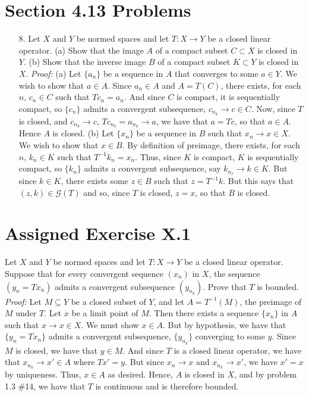 \documentclass{article}
\begin{document}
\section*{Section 4.13 Problems}
\begin{itemize}
    \item[8.] Let $X$ and $Y$ be normed spaces and let $T: X \to Y$ be a closed linear operator. (a) Show that the image $A$ of a compact subset $C \subset X$ is closed in $Y$. (b) Show that the inverse image $B$ of a compact subset $K \subset Y$ is closed in $X$. 
    \newline\newline
    \textit{Proof:} (a) Let $\{a_n\}$ be a sequence in $A$ that converges to some $a \in Y$. We wish to show that $a \in A$. Since $a_n \in A$ and $A = T(C)$, there exists, for each $n$, $c_n \in C$ such that $Tc_n = a_n$. And since $C$ is compact, it is sequentially compact, so $\{c_n\}$ admits a convergent subsequence, $c_{n_k} \to c \in C$. Now, since $T$ is closed, and $c_{n_k} \to c$, $Tc_{n_k} = a_{n_k} \to a$, we have that $a = Tc$, so that $a \in A$. Hence $A$ is closed.
    \newline\newline
    (b) Let $\{x_n\}$ be a sequence in $B$ such that $x_n \to x \in X$. We wish to show that $x \in B$. By definition of preimage, there exists, for each $n$, $k_n \in K$ such that $T^{-1}k_n = x_n$. Thus, since $K$ is compact, $K$ is sequentially compact, so $\{k_n\}$ admits a convergent subsequence, say $k_{n_{\ell}} \to k \in K$. But since $k \in K$, there exists some $z \in B$ such that $z = T^{-1}k$. But this says that $(z,k) \in \mathcal{G}(T)$ and so, since $T$ is closed, $z = x$, so that $B$ is closed.

\end{itemize}

\section*{Assigned Exercise X.1}
Let $X$ and $Y$ be normed spaces and let $T: X \to Y$ be a closed linear operator. Suppose that for every convergent sequence $(x_n)$ in $X$, the sequence $(y_n = Tx_n)$ admits a convergent subsequence $(y_{n_k})$. Prove that $T$ is bounded.
\newline\newline
\textit{Proof:} Let $M \subseteq Y$ be a closed subset of $Y$, and let $A = T^{-1}(M)$, the preimage of $M$ under $T$. Let $x$ be a limit point of $M$. Then there exists a sequence $\{x_n\}$ in $A$ such that $x \to x \in X$. We must show $x \in A$. But by hypothesis, we have that $\{y_n = Tx_n\}$ admits a convergent subsequence, $\{y_{n_k}\}$ converging to some $y$. Since $M$ is closed, we have that $y \in M$. And since $T$ is a closed linear operator, we have that $x_{n_k} \to x' \in A$ where $Tx' = y$. But since $x_n \to x$ and $x_{n_k} \to x'$, we have $x' = x$ by uniqueness. Thus, $x \in A$ as desired. Hence, $A$ is closed in $X$, and by problem 1.3 \#14, we have that $T$ is continuous and is therefore bounded.
\end{document}
